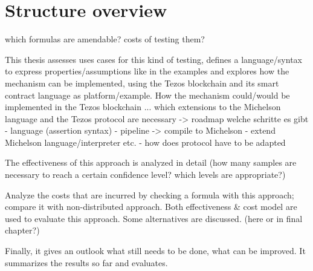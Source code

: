 


\section{Structure overview}
which formulas are amendable?
costs of testing them?

This thesis assesses uses cases for this kind of testing, defines a language/syntax to express properties/assumptions like in the examples and explores how the mechanism can be implemented, using the Tezos blockchain and its smart contract language as platform/example. 
How the mechanism could/would be implemented in the Tezos blockchain ...
which extensions to the Michelson language and the Tezos protocol are necessary
-> roadmap welche schritte es gibt
	- language (assertion syntax)
	- pipeline -> compile to Michelson
	- extend Michelson language/interpreter etc.
	- how does protocol have to be adapted
	
The effectiveness of this approach is analyzed in detail (how many samples are necessary to reach a certain confidence level? which levels are appropriate?)

Analyze the costs that are incurred by checking a formula with this approach; compare it with non-distributed approach.
Both effectiveness \& cost model are used to evaluate this approach. Some alternatives are discussed. (here or in final chapter?)

Finally, it gives an outlook what still needs to be done, what can be improved. It summarizes the results so far and evaluates.





